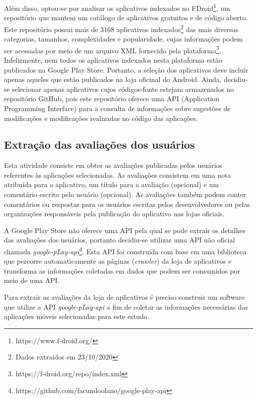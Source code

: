 Além disso, optou-se por analisar os aplicativos indexados no FDroid\footnote{https://www.f-droid.org/}, um repositório que mantem um catálogo de aplicativos gratuitos e de código aberto. Este repositório possui mais de 3168 aplicativos indexados\footnote{Dados extraídos em 23/10/2020} das mais diversas categorias, tamanhos, complexidades e popularidade, cujas informações podem ser acessadas por meio de um arquivo XML fornecido pela plataforma\footnote{https://f-droid.org/repo/index.xml}. 
Infelizmente, nem todos os aplicativos indexados nesta plataforma estão publicados na Google Play Store. Portanto, a seleção dos aplicativos deve incluir apenas aqueles que estão publicados na loja oficinal do Android. Ainda, decidiu-se selecionar apenas aplicativos cujos códigos-fonte estejam armazenados no repositório GitHub, pois este repositório oferece uma API (Application Programming Interface) para a consulta de informações sobre sugestões de modificações e modificações realizadas no código das aplicações.


\subsection{Extração das avaliações dos usuários}
\label{sec:extracaoavaliacoes}

Esta atividade consiste em obter as avaliações publicadas pelos usuários referentes às aplicações selecionadas. As avaliações consistem em uma nota atribuída para o aplicativo, um título para a avaliação (opcional) e um comentário escrito pelo usuário (opcional). As avaliações também podem conter comentários ou respostas para os usuários escritas pelos desenvolvedores ou pelas organizações responsáveis pela publicação do aplicativo nas lojas oficiais. 

A Google Play Store não oferece uma API pela qual se pode extrair os detalhes das avaliações dos usuários, portanto decidiu-se utilizar uma API não oficial chamada \textit{google-pLay-api}\footnote{https://github.com/facundoolano/google-play-api}. Esta API foi construída com base em uma biblioteca que percorre automaticamente as páginas (\textit{crawler}) da loja de aplicativos e transforma as informações coletadas em dados que podem ser consumidos por meio de uma API.

Para extrair as avaliações da loja de aplicativos é preciso construir um software que utilize a API  \textit{google-pLay-api} a fim de coletar as informações necessárias das aplicações móveis selecionadas para este estudo. 

